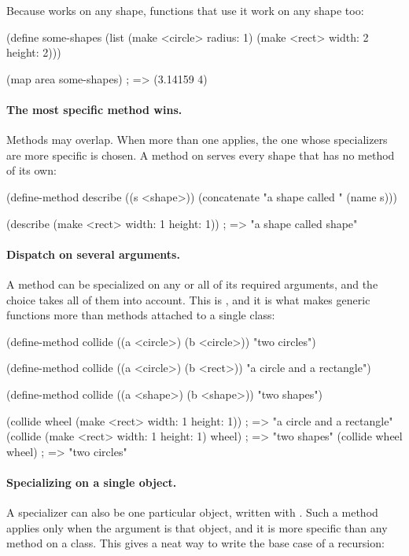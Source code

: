 Because  works on any shape, functions that use it work on any
shape too:

\begin{dylan}
(define some-shapes
  (list (make <circle> radius: 1) (make <rect> width: 2 height: 2)))

(map area some-shapes)          ; => (3.14159 4)
\end{dylan}

\paragraph{The most specific method wins.} Methods may overlap. When more
than one applies, the one whose specializers are more specific is chosen.
A method on  serves every shape that has no method of its
own:

\begin{dylan}
(define-method describe ((s <shape>))
  (concatenate "a shape called " (name s)))

(describe (make <rect> width: 1 height: 1))   ; => "a shape called shape"
\end{dylan}

\paragraph{Dispatch on several arguments.} A method can be specialized on
any or all of its required arguments, and the choice takes all of them
into account. This is , and it is what makes
generic functions more than methods attached to a single class:

\begin{dylan}
(define-method collide ((a <circle>) (b <circle>))
  "two circles")

(define-method collide ((a <circle>) (b <rect>))
  "a circle and a rectangle")

(define-method collide ((a <shape>) (b <shape>))
  "two shapes")

(collide wheel (make <rect> width: 1 height: 1))  ; => "a circle and a rectangle"
(collide (make <rect> width: 1 height: 1) wheel)  ; => "two shapes"
(collide wheel wheel)                             ; => "two circles"
\end{dylan}

\paragraph{Specializing on a single object.}
A specializer can also be one particular object, written with
. Such a method applies only when the argument is that
object, and it is more specific than any method on a class. This gives a
neat way to write the base case of a recursion:

